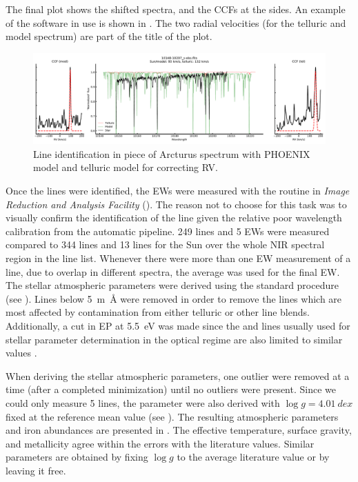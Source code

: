 The final plot shows the shifted spectra, and the CCFs at the sides. An example of the software in
use is shown in . The two radial velocities (for the telluric and model
spectrum) are part of the title of the plot.
\begin{figure}[htpb!]
    \centering
    \includegraphics[width=1.0\linewidth]{figures/plot_fits.pdf}
    \caption{Line identification in piece of Arcturus spectrum with PHOENIX model and telluric model
             for correcting RV.}
    \label{fig:plot_fits}
\end{figure}
Once the lines were identified, the EWs were measured with the  routine in \emph{Image
Reduction and Analysis Facility} (). The reason not to choose  for this task
was to visually confirm the identification of the line given the relative poor wavelength
calibration from the automatic pipeline. 249  lines and 5  EWs were measured
compared to 344  lines and 13  lines for the Sun over the whole NIR spectral
region in the line list. Whenever there were more than one EW measurement of a line, due to overlap
in different spectra, the average was used for the final EW. The stellar atmospheric parameters were
derived using the standard procedure (see ). Lines below \SI{5}{m\angstrom}
were removed in order to remove the lines which are most affected by contamination from either
telluric or other line blends. Additionally, a cut in EP at \SI{5.5}{eV} was made since the
 and  lines usually used for stellar parameter determination in the optical
regime are also limited to similar values \citep[see e.g][]{Sousa2008a}.

When deriving the stellar atmospheric parameters, one outlier were removed at a time (after a
completed minimization) until no outliers were present. Since we could only measure 5 
lines, the parameter were also derived with $\log g=\SI{4.01}{dex}$ fixed at the reference mean
value (see ). The resulting atmospheric parameters and iron abundances are
presented in . The effective temperature, surface gravity, and metallicity
agree within the errors with the literature values. Similar parameters are obtained by fixing $\log
g$ to the average literature value or by leaving it free.

